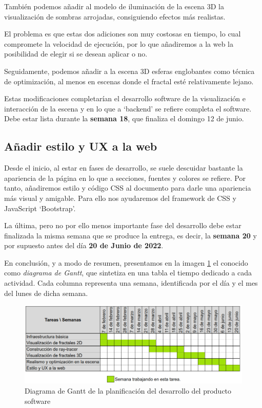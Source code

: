 También podemos añadir al modelo de iluminación de la escena 3D la visualización de sombras arrojadas, consiguiendo efectos más realistas.

El problema es que estas dos adiciones son muy costosas en tiempo, lo cual compromete la velocidad de ejecución, por lo que añadiremos a la web la posibilidad de elegir si se desean aplicar o no. 

Seguidamente, podemos añadir a la escena 3D esferas englobantes como técnica de optimización, al menos en escenas donde el fractal esté relativamente lejano.

Estas modificaciones completarían el desarrollo software de la visualización e interacción de la escena y en lo que a `backend' se refiere completa el software. Debe estar lista durante la \textbf{semana 18}, que finaliza el domingo 12 de junio.

\subsection{Añadir estilo y UX a la web}

Desde el inicio, al estar en fases de desarrollo, se suele descuidar bastante la apariencia de la página en lo que a secciones, fuentes y colores se refiere. Por tanto, añadiremos estilo y código CSS al documento para darle una apariencia más visual y amigable. Para ello nos ayudaremos del framework de CSS y JavaScript `Bootstrap'.

La última, pero no por ello menos importante fase del desarrollo debe estar finalizada la misma semana que se produce la entrega, es decir, la \textbf{semana 20} y por supuesto antes del día \textbf{20 de Junio de 2022}.

\newpage

En conclusión, y a modo de resumen, presentamos en la imagen \ref{fig:Gantt} el conocido como \textit{diagrama de Gantt}, que sintetiza en una tabla el tiempo dedicado a cada actividad. Cada columna representa una semana, identificada por el día y el mes del lunes de dicha semana.

\begin{figure} [ht]
    \centering
    \includegraphics[scale = 0.44]{img/C6/Gantt.png}
    \caption{Diagrama de Gantt de la planificación del desarrollo del producto software}
    \label{fig:Gantt}
\end{figure}

